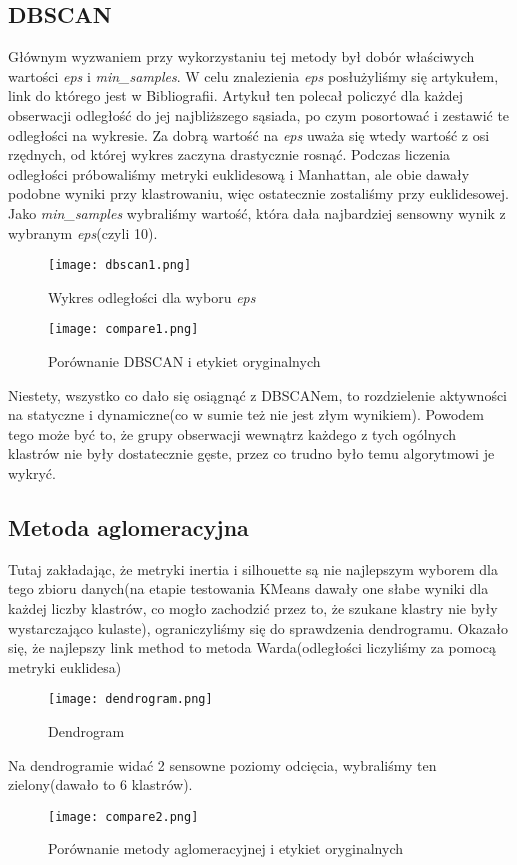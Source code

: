 \documentclass[14pt]{article}
\begin{document}
\subsection*{DBSCAN}
Głównym wyzwaniem przy wykorzystaniu tej metody był dobór właściwych wartości \textit{eps} i \textit{min\_samples}. W celu znalezienia \textit{eps} posłużyliśmy się artykułem, link do którego jest w Bibliografii. Artykuł ten polecał policzyć dla każdej obserwacji odległość do jej najbliższego sąsiada, po czym posortować i zestawić te odległości na wykresie. Za dobrą wartość na \textit{eps} uważa się wtedy wartość z osi rzędnych, od której wykres zaczyna drastycznie rosnąć. Podczas liczenia odległości próbowaliśmy metryki euklidesową i Manhattan, ale obie dawały podobne wyniki przy klastrowaniu, więc ostatecznie zostaliśmy przy euklidesowej. Jako \textit{min\_samples} wybraliśmy wartość, która dała najbardziej sensowny wynik z wybranym \textit{eps}(czyli 10).

\begin{figure}[htp]
    \centering
    \texttt{[image: dbscan1.png]}
    \caption{Wykres odległości dla wyboru \textit{eps}}
\end{figure}

\begin{figure}[!htp]
    \centering
    \texttt{[image: compare1.png]}
    \caption{Porównanie DBSCAN i etykiet oryginalnych}
\end{figure}
\newpage
\noindent
Niestety, wszystko co dało się osiągnąć z DBSCANem, to rozdzielenie aktywności na statyczne i dynamiczne(co w sumie też nie jest złym wynikiem). Powodem tego może być to, że grupy obserwacji wewnątrz każdego z tych ogólnych klastrów nie były dostatecznie gęste, przez co trudno było temu algorytmowi je wykryć. 
\subsection*{Metoda aglomeracyjna}
Tutaj zakładając, że metryki inertia i silhouette są nie najlepszym wyborem dla tego zbioru danych(na etapie testowania KMeans dawały one słabe wyniki dla każdej liczby klastrów, co mogło zachodzić przez to, że szukane klastry nie były wystarczająco kulaste), ograniczyliśmy się do sprawdzenia dendrogramu. Okazało się, że najlepszy link method to metoda Warda(odległości liczyliśmy za pomocą metryki euklidesa)

\begin{figure}[!htp]
    \centering
    \texttt{[image: dendrogram.png]}
    \caption{Dendrogram}
\end{figure}
\noindent
Na dendrogramie widać 2 sensowne poziomy odcięcia, wybraliśmy ten zielony(dawało to 6 klastrów).
\newpage
\begin{figure}[!htp]
    \centering
    \texttt{[image: compare2.png]}
    \caption{Porównanie metody aglomeracyjnej i etykiet oryginalnych}
\end{figure}
\end{document}
